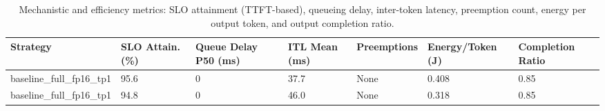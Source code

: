 \begin{table}
\caption{Mechanistic and efficiency metrics: SLO attainment (TTFT-based), queueing delay, inter-token latency, preemption count, energy per output token, and output completion ratio.}
\label{tab:efficiency}
\begin{tabular}{lllllll}
\toprule
Strategy & SLO Attain. (\%) & Queue Delay P50 (ms) & ITL Mean (ms) & Preemptions & Energy/Token (J) & Completion Ratio \\
\midrule
baseline\_full\_fp16\_tp1 & 95.6 & 0 & 37.7 & None & 0.408 & 0.85 \\
baseline\_full\_fp16\_tp1 & 94.8 & 0 & 46.0 & None & 0.318 & 0.85 \\
\bottomrule
\end{tabular}
\end{table}
